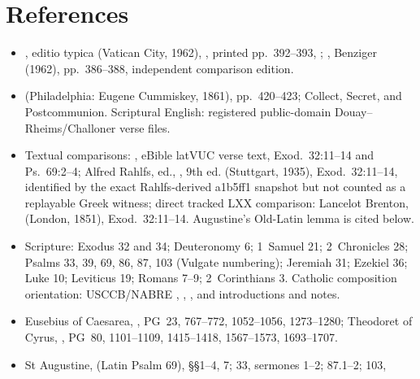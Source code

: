 \section*{References}

{\raggedright\fontsize{7.05}{7.45}\selectfont
\begin{itemize}[itemsep=0em,topsep=0.15em,parsep=0pt]
\item {}, editio typica (Vatican City, 1962),
, printed pp.~392--393,
;
, Benziger  (1962),
pp.~386--388, independent comparison edition.
\item {} (Philadelphia: Eugene Cummiskey, 1861), pp.~420--423; Collect,
Secret, and Postcommunion. Scriptural English: registered public-domain
Douay--Rheims/Challoner verse files.
\item Textual comparisons: ,
eBible latVUC verse text, Exod.~32:11--14 and Ps.~69:2--4; Alfred Rahlfs, ed.,
, 9th ed. (Stuttgart, 1935), Exod.~32:11--14, identified by
the exact Rahlfs-derived a1b5ff1 snapshot but not counted as a replayable Greek
witness; direct tracked LXX comparison: Lancelot Brenton,
 (London, 1851),
Exod.~32:11--14. Augustine's Old-Latin lemma is cited below.
\item Scripture: Exodus 32 and 34; Deuteronomy 6; 1~Samuel 21;
2~Chronicles 28; Psalms 33, 39, 69, 86, 87, 103 (Vulgate numbering); Jeremiah
31; Ezekiel 36; Luke 10; Leviticus 19; Romans 7--9; 2~Corinthians 3.
Catholic composition orientation: USCCB/NABRE
,
,
, and
introductions and notes.
\item Eusebius of Caesarea, , PG~23,
767--772, 1052--1056, 1273--1280; Theodoret of Cyrus,
, PG~80, 1101--1109, 1415--1418,
1567--1573, 1693--1707.
\item St Augustine, 
(Latin Psalm 69), §§1--4, 7;
 33, sermones 1--2; 87.1--2; 103,

\end{itemize}}

